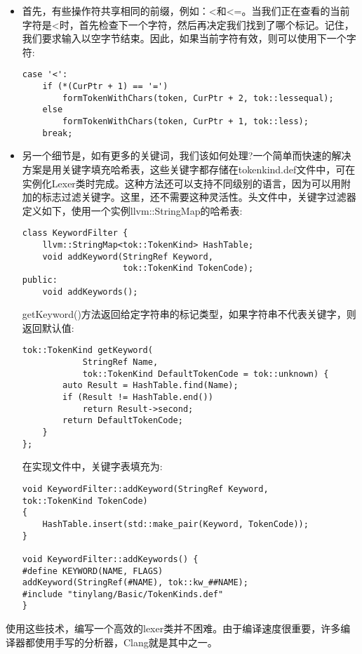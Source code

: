 \begin{itemize}
\item 首先，有些操作符共享相同的前缀，例如：<和<=。当我们正在查看的当前字符是<时，首先检查下一个字符，然后再决定我们找到了哪个标记。记住，我们要求输入以空字节结束。因此，如果当前字符有效，则可以使用下一个字符:
\begin{lstlisting}[caption={}]
case '<':
	if (*(CurPtr + 1) == '=')
		formTokenWithChars(token, CurPtr + 2, tok::lessequal);
	else
		formTokenWithChars(token, CurPtr + 1, tok::less);
	break;
\end{lstlisting}

\item 另一个细节是，如有更多的关键词，我们该如何处理?一个简单而快速的解决方案是用关键字填充哈希表，这些关键字都存储在tokenkind.def文件中，可在实例化Lexer类时完成。这种方法还可以支持不同级别的语言，因为可以用附加的标志过滤关键字。这里，还不需要这种灵活性。头文件中，关键字过滤器定义如下，使用一个实例llvm::StringMap的哈希表:
\begin{lstlisting}[caption={}]
class KeywordFilter {
	llvm::StringMap<tok::TokenKind> HashTable;
	void addKeyword(StringRef Keyword,
					tok::TokenKind TokenCode);
public:
	void addKeywords();
\end{lstlisting}

getKeyword()方法返回给定字符串的标记类型，如果字符串不代表关键字，则返回默认值:
\begin{lstlisting}[caption={}]
	tok::TokenKind getKeyword(
			StringRef Name,
			tok::TokenKind DefaultTokenCode = tok::unknown) {
		auto Result = HashTable.find(Name);
		if (Result != HashTable.end())
			return Result->second;
		return DefaultTokenCode;
	}
};
\end{lstlisting}

在实现文件中，关键字表填充为:
\begin{lstlisting}[caption={}]
void KeywordFilter::addKeyword(StringRef Keyword,
tok::TokenKind TokenCode)
{
	HashTable.insert(std::make_pair(Keyword, TokenCode));
}

void KeywordFilter::addKeywords() {
#define KEYWORD(NAME, FLAGS)
addKeyword(StringRef(#NAME), tok::kw_##NAME);
#include "tinylang/Basic/TokenKinds.def"
}
\end{lstlisting}

\end{itemize}

使用这些技术，编写一个高效的lexer类并不困难。由于编译速度很重要，许多编译器都使用手写的分析器，Clang就是其中之一。\par


































